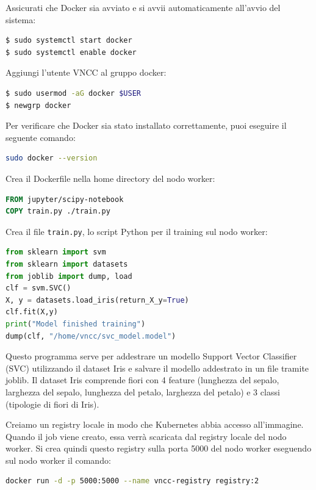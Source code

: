 \documentclass[11pt, a4paper]{article}
\begin{document}
Assicurati che Docker sia avviato e si avvii automaticamente all'avvio del sistema:
\begin{lstlisting}[language=bash]
$ sudo systemctl start docker
$ sudo systemctl enable docker
\end{lstlisting}

Aggiungi l'utente VNCC al gruppo docker:
\begin{lstlisting}[language=bash]
$ sudo usermod -aG docker $USER
$ newgrp docker
\end{lstlisting}

Per verificare che Docker sia stato installato correttamente, puoi eseguire il seguente comando:
\begin{lstlisting}[language=bash]
sudo docker --version
\end{lstlisting}

Crea il Dockerfile nella home directory del nodo worker:
\begin{lstlisting}[language=dockerfile]
FROM jupyter/scipy-notebook
COPY train.py ./train.py
\end{lstlisting}


Crea il file \texttt{train.py}, lo script Python per il training sul nodo worker:
\begin{lstlisting}[language=Python]
from sklearn import svm
from sklearn import datasets
from joblib import dump, load
clf = svm.SVC()
X, y = datasets.load_iris(return_X_y=True)
clf.fit(X,y)
print("Model finished training")
dump(clf, "/home/vncc/svc_model.model")
\end{lstlisting}

Questo programma serve per addestrare un modello Support Vector Classifier (SVC) utilizzando il dataset Iris e salvare il modello addestrato in un file tramite joblib. Il dataset Iris comprende fiori con 4 feature (lunghezza del sepalo, larghezza del sepalo, lunghezza del petalo, larghezza del petalo) e 3 classi (tipologie di fiori di Iris).

Creiamo un registry locale in modo che Kubernetes abbia accesso all'immagine. Quando il job viene creato, essa verrà scaricata dal registry locale del nodo worker. Si crea quindi questo registry sulla porta 5000 del nodo worker eseguendo sul nodo worker il comando:

\begin{lstlisting}[language=bash]
docker run -d -p 5000:5000 --name vncc-registry registry:2
\end{lstlisting}
\end{document}
